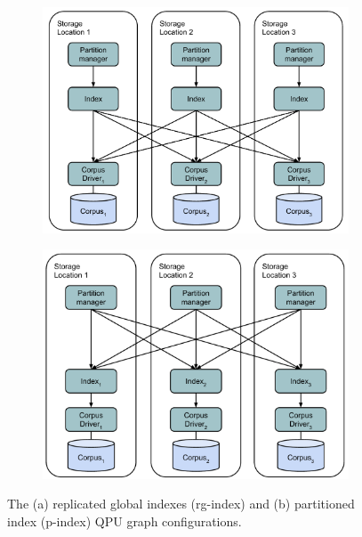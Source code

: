 \begin{figure}[H]
  \begin{subfigure}{0.5\textwidth}
    \includegraphics[width=\linewidth]{./figures/evaluation/rg_index.pdf}
    \caption{}
    \label{fig:rg_index}
  \end{subfigure}%
  \hspace*{\fill}
  \begin{subfigure}{0.5\textwidth}
    \includegraphics[width=\linewidth]{./figures/evaluation/p_index.pdf}
    \caption{}
    \label{fig:p_index}
  \end{subfigure}%
  \caption{The (a) replicated global indexes (rg-index) and (b) partitioned index (p-index) QPU graph configurations.}
  \label{fig:p_rg_index}
\end{figure}

